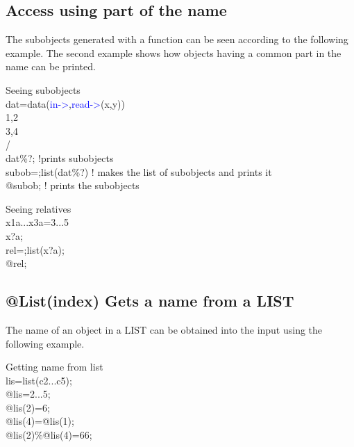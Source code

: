 \subsection{Access using part of the name}
\label{inpusubobj}
The subobjects generated with a function can be seen according
to the following example. The second example shows how objects having a common part in the
name can be printed.
\begin{example}[subobjex]Seeing subobjects\\
\label{subobjex}
dat=\textcolor{VioletRed}{data}(\textcolor{blue}{in->},\textcolor{blue}{read->}(x,y))\\
1,2\\
3,4\\
/\\
dat\%?; !prints subobjects\\
subob=;list(dat\%?) ! makes the list of subobjects and prints it\\
@subob;  ! prints the subobjects
\end{example}
\begin{example}[relativesex]Seeing relatives\\
\label{relativesex}
x1a...x3a=3...5\\
x?a;\\
rel=;list(x?a);\\
@rel;
\end{example}
\subsection{@List(index) Gets a name from a LIST}
\label{inpulistelem}
The name of an object in a LIST can be obtained into the input using the following example.
\begin{example}[inpulistelem]Getting name from list\\
\label{inpulistelem}
lis=\textcolor{VioletRed}{list}(c2...c5);\\
@lis=2...5;\\
@lis(2)=6;\\
@lis(4)=@lis(1);\\
@lis(2)\%@lis(4)=66;
\end{example}
